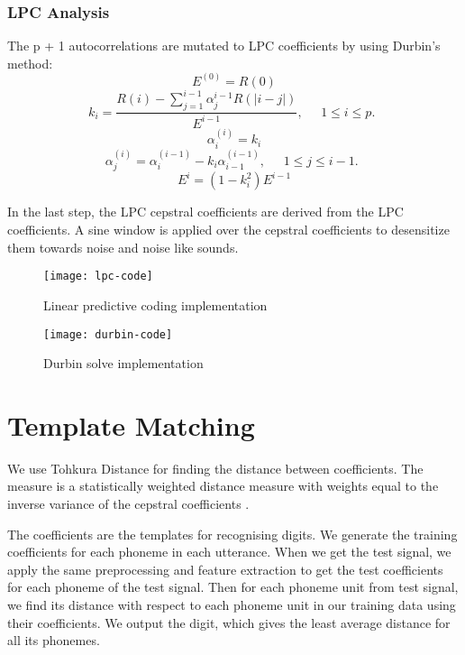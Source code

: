\subsubsection{LPC Analysis}
The p + 1 autocorrelations are mutated to LPC coefficients by using Durbin’s method:
\begin{equation} E^{(0)} = R(0) \end{equation}
\begin{equation} k_i = \dfrac{R(i) - \sum_{j=1}^{i-1}\alpha_j^{i-1}R(|i-j|)}{E^{i-1}},  \quad \begin{aligned} 1 \leq i \leq p. \end{aligned} \end{equation}
\begin{equation} \alpha_i^{(i)} = k_i \end{equation}
\begin{equation}\alpha_j^{(i)} = \alpha_i^{(i-1)} - k_i\alpha_{i-1}^{(i-1)},   \quad \begin{aligned} 1 \leq j \leq i-1. \end{aligned}\end{equation}
\begin{equation} E^{i} = (1-k_i^2)E^{i-1} \end{equation}

In the last step, the LPC cepstral coefficients are derived from the LPC coefficients. A sine window is applied over the cepstral coefficients to desensitize them towards noise and noise like sounds. 

\begin{figure}[h!]
    \centering
    \texttt{[image: lpc-code]}
    \label{fig:lpc-code}
    \caption{Linear predictive coding implementation}
\end{figure}

\begin{figure}[h!]
    \centering
    \texttt{[image: durbin-code]}
    \label{fig:durbin-code}
    \caption{Durbin solve implementation}
\end{figure}


\section{Template Matching}

We use Tohkura Distance for finding the distance between coefficients. The measure is a statistically weighted distance measure with weights equal to the inverse variance of the cepstral coefficients \cite{1165058}.

The coefficients are the templates for recognising digits. We generate the training coefficients for each phoneme in each utterance. When we get the test signal, we apply the same preprocessing and feature extraction to get the test coefficients for each phoneme of the test signal. Then for each phoneme unit from test signal, we find its distance with respect to each phoneme unit in our training data using their coefficients. We output the digit, which gives the least average distance for all its phonemes.